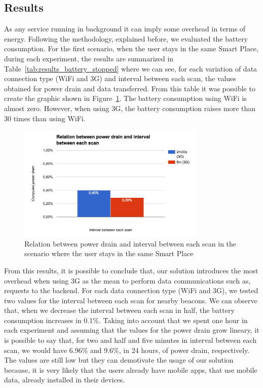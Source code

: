 \subsection{Results}
\label{sub:evaluation_energy_consumption_results}
As any service running in background it can imply some overhead in terms of energy.
Following the methodology, explained before, we evaluated the battery consumption.
For the first scenario, when the user stays in the same Smart Place, during each experiment, the results are summarized in Table~\ref{tab:results_battery_stopped} where we can see, for each variation of data connection type (\gls{WiFi} and \gls{3G}) and interval between each scan, the values obtained for power drain and data transferred.
From this table it was possible to create the graphic shown in Figure~\ref{fig:results_battery_stopped}.
The battery consumption using \gls{WiFi} is almost zero.
However, when using \gls{3G}, the battery consumption raises more than 30 times than using \gls{WiFi}.


\begin{figure}[!ht]
  \centering
    \includegraphics[width=0.8\textwidth, keepaspectratio]{images/results_battery_stopped}
    \caption[Power drain when the user does not move]{Relation between power drain and interval between each scan in the scenario where the user stays in the same Smart Place}
    \label{fig:results_battery_stopped}
\end{figure}

From this results, it is possible to conclude that, our solution introduces the most overhead when using \gls{3G} as the mean to perform data communications such as, requests to the backend.
For each data connection type (\gls{WiFi} and \gls{3G}), we tested two values for the interval between each scan for nearby beacons.
We can observe that, when we decrease the interval between each scan in half, the battery consumption increases in 0.1\%.
Taking into account that we spent one hour in each experiment and assuming that the values for the power drain grow lineary, it is possible to say that, for two and half and five minutes in interval between each scan, we would have 6.96\% and 9.6\%, in 24 hours, of power drain, respectively.
The values are still low but they can demotivate the usage of our solution because, it is very likely that the users already have mobile apps, that use mobile data, already installed in their devices.

